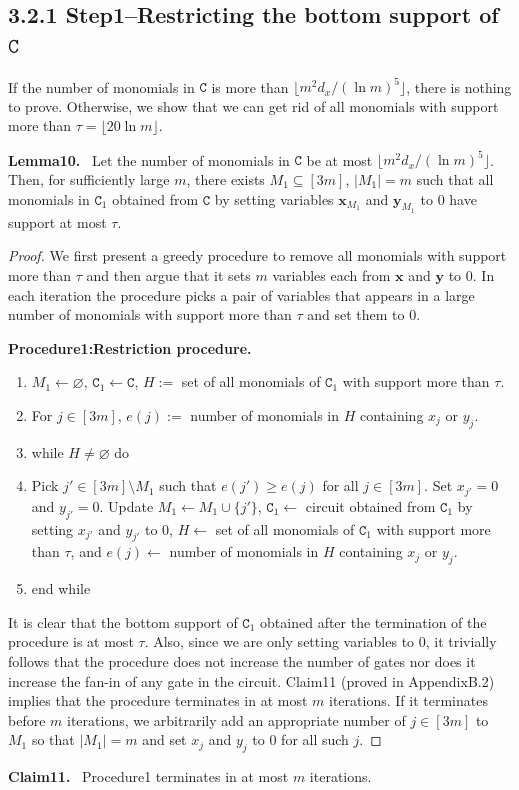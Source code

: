 \documentclass[10pt,a4paper]{article}
\newenvironment{authorclaim}[1]{\par\medskip\noindent\textbf{#1.}\ \ignorespaces}{\par\medskip}
\begin{document}
\subsection*{3.2.1 Step1--Restricting the bottom support of $\mathtt C$}
If the number of monomials in $\mathtt C$ is more than $\lfloor m^2d_x/(\ln m)^5\rfloor$, there is nothing to prove. Otherwise, we show that we can get rid of all monomials with support more than $\tau=\lfloor20\ln m\rfloor$.
\begin{authorclaim}{Lemma10}
Let the number of monomials in $\mathtt C$ be at most $\lfloor m^2d_x/(\ln m)^5\rfloor$. Then, for sufficiently large $m$, there exists $M_1\subseteq[3m]$, $|M_1|=m$ such that all monomials in $\mathtt C_1$ obtained from $\mathtt C$ by setting variables $\mathbf x_{M_1}$ and $\mathbf y_{M_1}$ to 0 have support at most $\tau$.
\end{authorclaim}
\begin{proof}
We first present a greedy procedure to remove all monomials with support more than $\tau$ and then argue that it sets $m$ variables each from $\mathbf x$ and $\mathbf y$ to 0. In each iteration the procedure picks a pair of variables that appears in a large number of monomials with support more than $\tau$ and set them to 0.
\begin{authorclaim}{Procedure1:Restriction procedure}
\begin{enumerate}
\item $M_1\leftarrow\varnothing$, $\mathtt C_1\leftarrow\mathtt C$, $H:=$ set of all monomials of $\mathtt C_1$ with support more than $\tau$.
\item For $j\in[3m]$, $e(j):=$ number of monomials in $H$ containing $x_j$ or $y_j$.
\item while $H\ne\varnothing$ do
\item Pick $j'\in[3m]\setminus M_1$ such that $e(j')\ge e(j)$ for all $j\in[3m]$. Set $x_{j'}=0$ and $y_{j'}=0$. Update $M_1\leftarrow M_1\cup\{j'\}$, $\mathtt C_1\leftarrow$ circuit obtained from $\mathtt C_1$ by setting $x_{j'}$ and $y_{j'}$ to 0, $H\leftarrow$ set of all monomials of $\mathtt C_1$ with support more than $\tau$, and $e(j)\leftarrow$ number of monomials in $H$ containing $x_j$ or $y_j$.
\item end while
\end{enumerate}
\end{authorclaim}
It is clear that the bottom support of $\mathtt C_1$ obtained after the termination of the procedure is at most $\tau$. Also, since we are only setting variables to 0, it trivially follows that the procedure does not increase the number of gates nor does it increase the fan-in of any gate in the circuit. Claim11 (proved in AppendixB.2) implies that the procedure terminates in at most $m$ iterations. If it terminates before $m$ iterations, we arbitrarily add an appropriate number of $j\in[3m]$ to $M_1$ so that $|M_1|=m$ and set $x_j$ and $y_j$ to 0 for all such $j$.
\end{proof}
\begin{authorclaim}{Claim11}
Procedure1 terminates in at most $m$ iterations.
\end{authorclaim}
\end{document}
